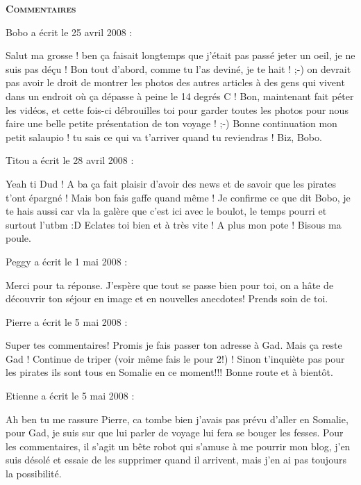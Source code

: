 \bigskip
\textbf{\textsc{Commentaires}}

\medskip
Bobo a écrit le 25 avril 2008 :
\begin{displayquote}
Salut ma grosse ! ben ça faisait longtemps que j'était pas passé jeter un oeil, je ne suis pas déçu !
Bon tout d'abord, comme tu l'as deviné, je te hait ! ;-) on devrait pas avoir le droit de montrer les photos des autres articles à des gens qui vivent dans un endroit où ça dépasse à peine le 14 degrés C !
Bon, maintenant fait péter les vidéos, et cette fois-ci débrouilles toi pour garder toutes les photos pour nous faire une belle petite présentation de ton voyage ! ;-)
Bonne continuation mon petit salaupio ! tu sais ce qui va t'arriver quand tu reviendras !
Biz, Bobo.
\end{displayquote}

\medskip
Titou a écrit le 28 avril 2008 :
\begin{displayquote}
Yeah ti Dud !
A ba ça fait plaisir d'avoir des news et de savoir que les pirates t'ont épargné ! Mais bon fais gaffe quand même !
Je confirme ce que dit Bobo, je te hais aussi car vla la galère que c'est ici avec le boulot, le temps pourri et surtout l'utbm :D Eclates toi bien et à très vite !
A plus mon pote !
Bisous ma poule.
\end{displayquote}

\medskip
Peggy a écrit le 1 mai 2008 :
\begin{displayquote}
Merci pour ta réponse. J'espère que tout se passe bien pour toi, on a hâte de découvrir ton séjour en image et en nouvelles anecdotes!
Prends soin de toi.
\end{displayquote}

\medskip
Pierre a écrit le 5 mai 2008 :
\begin{displayquote}
Super tes commentaires!
Promis je fais passer ton adresse à Gad.
Mais ça reste Gad !
Continue de triper (voir même fais le pour 2!) !
Sinon t'inquiète pas pour les pirates ils sont tous en Somalie en ce moment!!!
Bonne route et à bientôt.
\end{displayquote}

\medskip
Etienne a écrit le 5 mai 2008 :
\begin{displayquote}
Ah ben tu me rassure Pierre, ca tombe bien j'avais pas prévu d'aller en Somalie, pour Gad, je suis sur que lui parler de voyage lui fera se bouger les fesses.
Pour les commentaires, il s'agit un bête robot qui s'amuse à me pourrir mon blog, j'en suis désolé et essaie de les supprimer quand il arrivent, mais j'en ai pas toujours la possibilité.
\end{displayquote}

